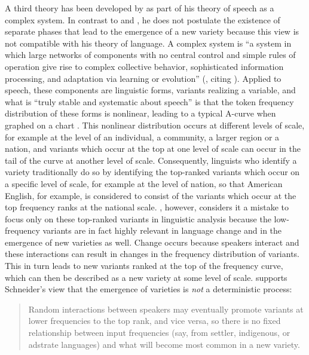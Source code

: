A third theory has been developed by \citet{Kretzschmar2014} as part of his theory of speech as a complex system. In contrast to \citet{Trudgill2004} and \citet{Schneider2007}, he does not postulate the existence of separate phases that lead to the emergence of a new variety because this view is not compatible with his theory of language. A complex system is “a system in which large networks of components with no central control and simple rules of operation give rise to complex collective behavior, sophisticated information processing, and adaptation via learning or evolution” (\citealt[143]{Kretzschmar2014}, citing \citealt[13]{Mitchell2009}). Applied to speech, these components are linguistic forms, variants realizing a variable, and what is “truly stable and systematic about speech” \citep[151]{Kretzschmar2014} is that the token frequency distribution of these forms is nonlinear, leading to a typical A-curve when graphed on a chart \citep[147]{Kretzschmar2014}. This nonlinear distribution occurs at different levels of scale, for example at the level of an individual, a community, a larger region or a nation, and variants which occur at the top at one level of scale can occur in the tail of the curve at another level of scale. Consequently, linguists who identify a variety traditionally do so by identifying the top-ranked variants which occur on a specific level of scale, for example at the level of nation, so that American English, for example, is considered to consist of the variants which occur at the top frequency ranks at the national scale. \citet[151]{Kretzschmar2014}, however, considers it a mistake to focus only on these top-ranked variants in linguistic analysis because the low-frequency variants are in fact highly relevant in language change and in the emergence of new varieties as well. Change occurs because speakers interact and these interactions can result in changes in the frequency distribution of variants. This in turn leads to new variants ranked at the top of the frequency curve, which can then be described as a new variety at some level of scale. \citet[151]{Kretzschmar2014} supports Schneider’s view that the emergence of varieties is \emph{not} a deterministic process:

\begin{quote}
Random interactions between speakers may eventually promote variants at lower frequencies to the top rank, and vice versa, so there is no fixed relationship between input frequencies (say, from settler, indigenous, or adstrate languages) and what will become most common in a new variety.
\end{quote}


